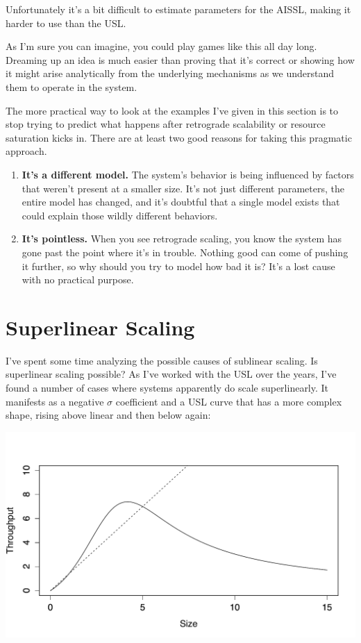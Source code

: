\documentclass{vivid_layout}
\begin{document}
Unfortunately it's a bit difficult to estimate parameters for the AISSL, making
it harder to use than the USL. 

As I'm sure you can imagine, you could play games like this all day long.
Dreaming up an idea is much easier than proving that it's correct or showing
how it might arise analytically from the underlying mechanisms as we understand
them to operate in the system.

The more practical way to look at the examples I've given in this section is to
stop trying to predict what happens after retrograde scalability or resource
saturation kicks in. There are at least two good reasons for taking this
pragmatic approach.

\begin{enumerate}
\item {\bfseries It's a different model.} The system's behavior is being
influenced by factors that weren't present at a smaller size. It's not just
different parameters, the entire model has changed, and it's doubtful that a
single model exists that could explain those wildly different behaviors.
\item {\bfseries It's pointless.}  When you see retrograde scaling, you know the
system has gone past the point where it's in trouble. Nothing good can come of
pushing it further, so why should you try to model how bad it is? It's a lost
cause with no practical purpose.
\end{enumerate}

\section{Superlinear Scaling}

I've spent some time analyzing the possible causes of sublinear scaling. Is
superlinear scaling possible? As I've worked with the USL over the years, I've
found a number of cases where systems apparently do scale superlinearly. It
manifests as a negative $\sigma$ coefficient and a USL curve that has a more
complex shape, rising above linear and then below again:
\begin{center}
\includegraphics[width=.85\linewidth]{scalability/superlinear}
\end{center}
\end{document}
